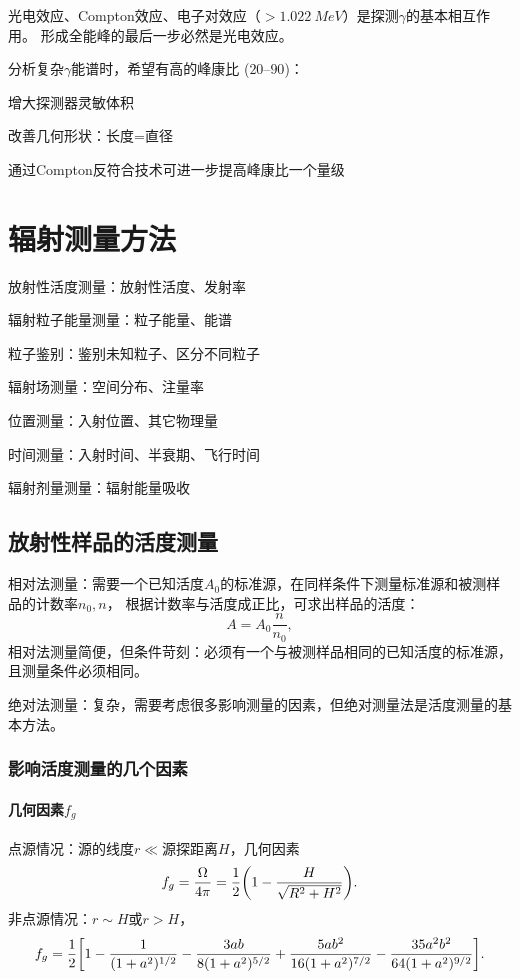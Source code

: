 光电效应、Compton效应、电子对效应（$>\SI{1.022}{MeV}$）是探测$\gamma$的基本相互作用。
形成全能峰的最后一步必然是光电效应。

分析复杂$\gamma$能谱时，希望有高的峰康比
($\numrange{20}{90}$)：
\begin{compactenum}
	\item 增大探测器灵敏体积
	\item 改善几何形状：长度=直径
	\item 通过Compton反符合技术可进一步提高峰康比一个量级
\end{compactenum}
\clearpage
{}
\clearpage
\section{辐射测量方法}
\begin{compactitem}
	\item 放射性活度测量：放射性活度、发射率
	\item 辐射粒子能量测量：粒子能量、能谱
	\item 粒子鉴别：鉴别未知粒子、区分不同粒子
	\item 辐射场测量：空间分布、注量率
	\begin{compactitem}
		\item 位置测量：入射位置、其它物理量
		\item 时间测量：入射时间、半衰期、飞行时间
		\item 辐射剂量测量：辐射能量吸收
	\end{compactitem}
\end{compactitem}
\subsection{放射性样品的活度测量}
相对法测量：需要一个已知活度$A_0$的标准源，在同样条件下测量标准源和被测样品的计数率$n_0,n$， 根据计数率与活度成正比，可求出样品的活度：
\[
	A=A_0\frac n{n_0},
\]
相对法测量简便，但条件苛刻：必须有一个与被测样品相同的已知活度的标准源，且测量条件必须相同。

绝对法测量：复杂，需要考虑很多影响测量的因素，但绝对测量法是活度测量的基本方法。
\subsubsection{影响活度测量的几个因素}
\paragraph{几何因素$f_g$}
点源情况：源的线度$r\ll$源探距离$H$，几何因素
\[
	f_g=\frac\Omega{4\pi}=\frac12\biggl(1-\frac H{\sqrt{R^2+H^2}}\biggr).
\]
非点源情况：$r\sim H$或$r>H$，
\[
	f_g=\frac12\biggl[1-\frac1{(1+a^2)^{1/2}}-\frac{3ab}{8(1+a^2)^{5/2}}+\frac{5ab^2}{16(1+a^2)^{7/2}}-\frac{35a^2b^2}{64(1+a^2)^{9/2}}\biggr].
\]
